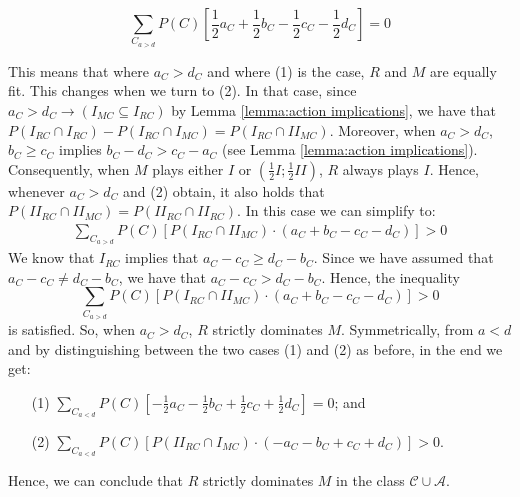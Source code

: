 \documentclass[fleqn,reqno,12pt]{article}
\theoremstyle{Satz}
\theoremstyle{Bsp}
\begin{document}
$$ \sum_{C_{a>d}} P(C)[\frac{1}{2}a_{C}+ \frac{1}{2}b_{C} - \frac{1}{2}c_{C} - \frac{1}{2}d_{C}]= 0 $$

\noindent This means that where $a_{C}>d_{C}$ and
where (1) is the case, $R$ and $M$ are equally fit. This changes when we turn to (2). In that
case, since $a_{C}>d_{C}\rightarrow(I_{MC}\subseteq I_{RC})$ by Lemma \ref{lemma:action implications}, we have that
$P(I_{RC} \cap I_{RC})-P(I_{RC}\cap I_{MC})=P(I_{RC}\cap II_{MC})$. Moreover, when $a_{C}>d_{C}$, $b_{C}\geq c_{C}$ implies
  $b_{C}-d_{C}>c_{C}-a_{C}$ (see Lemma \ref{lemma:action implications}). Consequently, when $M$ plays either $I$ or $  (\frac{1}{2}I;\frac{1}{2}II)$, $R$ always plays $I$. Hence, whenever $a_{C}>d_{C}$ and (2) obtain, it also holds that $P(II_{RC}\cap II_{MC})=P(II_{RC} \cap II_{RC})$. In this case we can simplify to:
\begin{align*}
\textstyle{\sum_{C_{a>d}}} P(C)[P(I_{RC}\cap II_{MC})\cdot (a_{C} + b_{C} - c_{C} - d_{C})]> 0
\end{align*}
\noindent We know that $I_{RC}$ implies that $a_{C}-c_{C}\geq d_{C}-b_{C}$.
Since we have assumed that $a_{C}-c_{C}\neq d_{C}-b_{C}$, we have that
$a_{C}-c_{C} > d_{C}-b_{C}$. Hence, the inequality
$$\sum_{C_{a>d}} P(C)[P(I_{RC}\cap II_{MC})\cdot (a_{C} + b_{C} - c_{C} - d_{C})]> 0$$
is satisfied. So, when $a_{C}>d_{C}$, $R$
strictly dominates $M$. Symmetrically, from $a<d$ and by distinguishing between the two cases
(1) and (2) as before, in the end we get:
\begin{itemize}
\item[(1)] $\sum_{C_{a<d}} P(C)[-\frac{1}{2}a_{C}- \frac{1}{2}b_{C} + \frac{1}{2}c_{C} + \frac{1}{2}d_{C}]= 0$; and
\item[(2)] $\sum_{C_{a<d}} P(C)[P(II_{RC}\cap I_{MC})\cdot (-a_{C} - b_{C} + c_{C} + d_{C})]> 0$.
\end{itemize}
\noindent Hence, we can conclude that $R$ strictly dominates $M$ in the class
$\mathcal{C}\cup\mathcal{A}$.

\medskip{}
\end{document}
